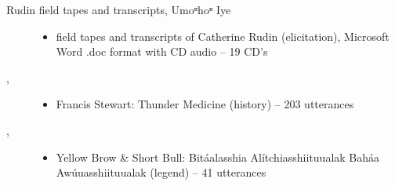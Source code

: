 \documentclass[output=paper]{LSP/langsci}
\begin{document}
\begin{description}
\item[Rudin field tapes and transcripts, Umoⁿhoⁿ Iye]\hfill
\begin{itemize}
\item field tapes and transcripts of Catherine Rudin (elicitation), Microsoft Word .doc format with CD audio -- 19 CD’s
\end{itemize}

\item[\citet{Wallace1993}, ]\hfill
\begin{itemize}
\item Francis Stewart: Thunder Medicine (history) -- 203 utterances
\end{itemize}

\item[\citet{YellowBrowShortBull1980}, ]\hfill
\begin{itemize}
\item Yellow Brow \& Short Bull: Bitáalasshia Alítchiasshiituualak Baháa Awúuasshiituualak (legend) -- 41 utterances
\end{itemize}

\end{description}

{\sloppy
\printbibliography[heading=subbibliography,notkeyword=this]
}
\let\eachwordone=\itshape
\let\eachwordtwo=\upshape
\end{document}
